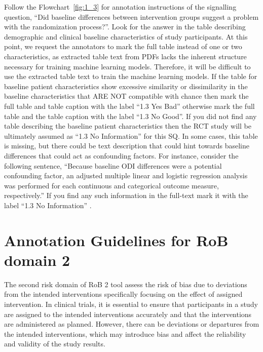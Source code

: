 \documentclass[sn-mathphys,Numbered]{sn-jnl}%
\begin{document}
%
%
%
Follow the Flowchart~\ref{fig:1_3} for annotation instructions of the signalling question, ``Did baseline differences between intervention groups suggest a problem with the randomization process?''.
Look for the answer in the table describing demographic and clinical baseline characteristics of study participants. 
At this point, we request the annotators to mark the full table instead of one or two characteristics, as extracted table text from PDFs lacks the inherent structure necessary for training machine learning models.
Therefore, it will be difficult to use the extracted table text to train the machine learning models. 
If the table for baseline patient characteristics show excessive similarity or dissimilarity in the baseline characteristics that ARE NOT compatible with chance then mark the full table and table caption with the label ``1.3 Yes Bad'' otherwise mark the full table and the table caption with the label ``1.3 No Good''.
If you did not find any table describing the baseline patient characteristics then the RCT study will be ultimately assumed as ``1.3 No Information'' for this SQ.
In some cases, this table is missing, but there could be text description that could hint towards baseline differences that could act as confounding factors.
For instance, consider the following sentence, ``Because baseline ODI differences were a potential confounding factor, an adjusted multiple linear and logistic regression analysis was performed for each continuous and categorical outcome measure, respectively.''%
If you find any such information in the full-text mark it with the label ``1.3 No Information'' .
%
%
%
\section*{Annotation Guidelines for RoB domain 2}
\label{sec:dom2}
%
The second risk domain of RoB 2 tool assess the risk of bias due to deviations from the intended interventions specifically focusing on the effect of assigned intervention.
In clinical trials, it is essential to ensure that participants in a study are assigned to the intended interventions accurately and that the interventions are administered as planned.
However, there can be deviations or departures from the intended interventions, which may introduce bias and affect the reliability and validity of the study results.
\end{document}
